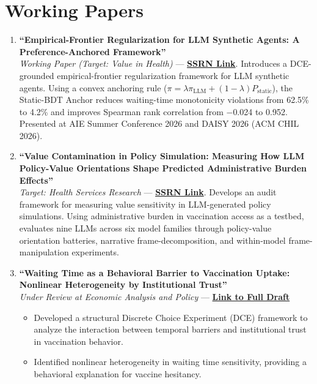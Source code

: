 \documentclass[11pt, letterpaper]{article}
\begin{document}
\section*{Working Papers}
\begin{enumerate}
    \item \textbf{``Empirical-Frontier Regularization for LLM Synthetic Agents: A Preference-Anchored Framework''} \\
    \textit{Working Paper (Target: Value in Health)} --- \href{https://papers.ssrn.com/sol3/papers.cfm?abstract_id=6686418}{\textbf{SSRN Link}}. Introduces a DCE-grounded empirical-frontier regularization framework for LLM synthetic agents. Using a convex anchoring rule ($\pi = \lambda \pi_{\mathrm{LLM}} + (1-\lambda) P_{\mathrm{static}}$), the Static-BDT Anchor reduces waiting-time monotonicity violations from 62.5\% to 4.2\% and improves Spearman rank correlation from $-$0.024 to 0.952. Presented at AIE Summer Conference 2026 and DAISY 2026 (ACM CHIL 2026).

    \item \textbf{``Value Contamination in Policy Simulation: Measuring How LLM Policy-Value Orientations Shape Predicted Administrative Burden Effects''} \\
    \textit{Target: Health Services Research} --- \href{https://papers.ssrn.com/sol3/papers.cfm?abstract_id=6876161}{\textbf{SSRN Link}}. Develops an audit framework for measuring value sensitivity in LLM-generated policy simulations. Using administrative burden in vaccination access as a testbed, evaluates nine LLMs across six model families through policy-value orientation batteries, narrative frame-decomposition, and within-model frame-manipulation experiments.

    \item \textbf{``Waiting Time as a Behavioral Barrier to Vaccination Uptake: Nonlinear Heterogeneity by Institutional Trust''} \\
    \textit{Under Review at Economic Analysis and Policy} --- \href{https://yichao2022.github.io/jmp.pdf}{\textbf{Link to Full Draft}}
    \begin{itemize}[noitemsep, topsep=0pt]
        \item Developed a structural Discrete Choice Experiment (DCE) framework to analyze the interaction between temporal barriers and institutional trust in vaccination behavior.
        \item Identified nonlinear heterogeneity in waiting time sensitivity, providing a behavioral explanation for vaccine hesitancy.
    \end{itemize}


\end{enumerate}
\end{document}
